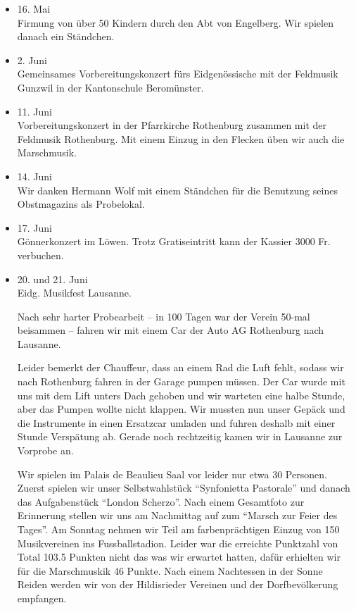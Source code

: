 \begin{history}
\begin{itemize}
        \item[]16. Mai\\
        Firmung von über 50 Kindern durch den Abt von Engelberg. Wir spielen
        danach ein Ständchen.

        \item[]2. Juni\\
        Gemeinsames Vorbereitungskonzert fürs Eidgenössische mit der Feldmusik
        Gunzwil in der Kantonschule Beromünster.

        \item[]11. Juni\\
        Vorbereitungskonzert in der Pfarrkirche Rothenburg zusammen mit der
        Feldmusik Rothenburg. Mit einem Einzug in den Flecken üben wir auch die
        Marschmusik.

        \item[]14. Juni\\
        Wir danken Hermann Wolf mit einem Ständchen für die Benutzung seines
        Obstmagazins als Probelokal.

        \item[]17. Juni\\
        Gönnerkonzert im Löwen. Trotz Gratiseintritt kann der Kassier 3000 Fr.
        verbuchen.

        \item[]20. und 21. Juni\\
        Eidg. Musikfest Lausanne.

        Nach sehr harter Probearbeit -- in 100 Tagen war der Verein 50-mal
        beisammen -- fahren wir mit einem Car der Auto AG Rothenburg nach
        Lausanne.

        Leider bemerkt der Chauffeur, dass an einem Rad die Luft fehlt, sodass
        wir nach Rothenburg fahren in der Garage pumpen müssen. Der Car wurde
        mit uns mit dem Lift unters Dach gehoben und wir warteten eine halbe
        Stunde, aber das Pumpen wollte nicht klappen. Wir mussten nun unser
        Gepäck und die Instrumente in einen Ersatzcar umladen und fuhren deshalb
        mit einer Stunde Verspätung ab. Gerade noch rechtzeitig kamen wir in
        Lausanne zur Vorprobe an.

        Wir spielen im Palais de Beaulieu Saal vor leider nur etwa 30 Personen.
        Zuerst spielen wir unser Selbstwahlstück \enquote{Synfonietta Pastorale} und
        danach das Aufgabenstück \enquote{London Scherzo}. Nach einem Gesamtfoto zur
        Erinnerung stellen wir uns am Nachmittag auf zum \enquote{Marsch zur Feier des
            Tages}. Am Sonntag nehmen wir Teil am farbenprächtigen Einzug von 150
        Musikvereinen ins Fussballstadion. Leider war die erreichte Punktzahl
        von Total 103.5 Punkten nicht das was wir erwartet hatten, dafür
        erhielten wir für die Marschmuskik 46 Punkte. Nach einem Nachtessen in
        der Sonne Reiden werden wir von der Hildisrieder Vereinen und der
        Dorfbevölkerung empfangen.


\end{itemize}
\end{history}
